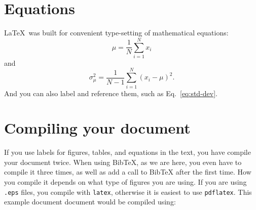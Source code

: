 \documentclass[preprint]{aastex631}
\begin{document}
\section{Equations}

\LaTeX\  was built for convenient type-setting of mathematical equations:
\begin{equation}
\mu = \frac{1}{N} \sum_{i = 1}^N x_i
\end{equation}
and
\begin{equation}
\sigma_\mu^2 = \frac{1}{N-1} \sum_{i = 1}^N (x_i - \mu)^2.
\label{eq:std-dev}
\end{equation}
And you can also label and reference them, such as Eq.~\ref{eq:std-dev}.

\section{Compiling your document}

If you use labels for figures, tables, and equations in the text, you have compile your document twice.  When using BibTeX, as we are here, you even have to compile it three times, as well as add a call to BibTeX after the first time.  How you compile it depends on what type of figures you are using.  If you are using {\tt .eps} files, you compile with {\tt latex}, otherwise it is easiest to use {\tt pdflatex}.  This example document document would be compiled using:



\end{document}
